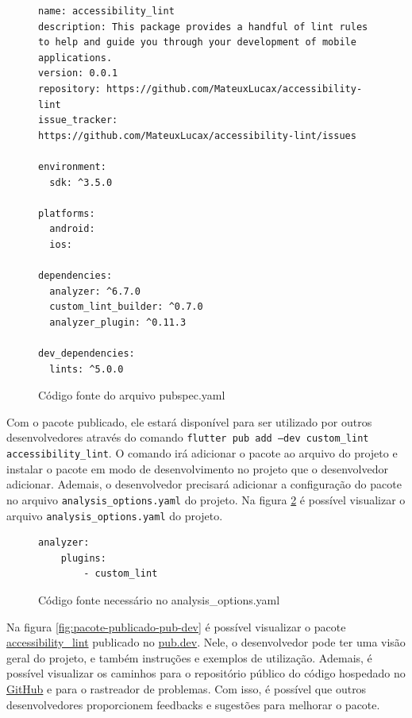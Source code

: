 \begin{figure}[!htbp]
\centering
\caption{Código fonte do arquivo pubspec.yaml}\label{fig:pubspec-yaml}
\begin{lstlisting}
name: accessibility_lint
description: This package provides a handful of lint rules to help and guide you through your development of mobile applications.
version: 0.0.1
repository: https://github.com/MateuxLucax/accessibility-lint
issue_tracker: https://github.com/MateuxLucax/accessibility-lint/issues

environment:
  sdk: ^3.5.0

platforms:
  android:
  ios:

dependencies:
  analyzer: ^6.7.0
  custom_lint_builder: ^0.7.0
  analyzer_plugin: ^0.11.3

dev_dependencies:
  lints: ^5.0.0
\end{lstlisting}
\vspace{2mm}
\end{figure}

Com o pacote publicado, ele estará disponível para ser utilizado por outros desenvolvedores através do comando \texttt{flutter pub add --dev custom\_lint accessibility\_lint}. O comando irá adicionar o pacote ao arquivo  do projeto e instalar o pacote em modo de desenvolvimento no projeto que o desenvolvedor adicionar. Ademais, o desenvolvedor precisará adicionar a configuração do pacote no arquivo \texttt{analysis\_options.yaml} do projeto. Na figura \ref{fig:analysis-options-yaml} é possível visualizar o arquivo \texttt{analysis\_options.yaml} do projeto.

\begin{figure}[!htbp]
\centering
\caption{Código fonte necessário no analysis\_options.yaml}\label{fig:analysis-options-yaml}
\begin{lstlisting}
analyzer:
	plugins:
		- custom_lint	
\end{lstlisting}
\vspace{2mm}
\end{figure}

Na figura \ref{fig:pacote-publicado-pub-dev} é possível visualizar o pacote \href{https://pub.dev/packages/accessibility_lint}{accessibility\_lint} publicado no \href{https://pub.dev/}{pub.dev}. Nele, o desenvolvedor pode ter uma visão geral do projeto, e também instruções e exemplos de utilização. Ademais, é possível visualizar os caminhos para o repositório público do código hospedado no \href{https://github.com/MateuxLucax/accessibility-lint}{GitHub} e para o rastreador de problemas. Com isso, é possível que outros desenvolvedores proporcionem feedbacks e sugestões para melhorar o pacote.

